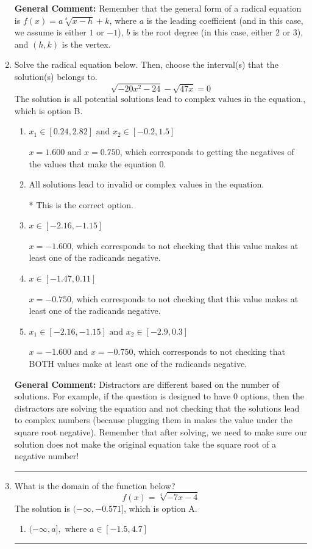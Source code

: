 \documentclass{extbook}[14pt]
\newcommand{\litem}[1]{\item #1

\rule{\textwidth}{0.4pt}}
\begin{document}
\begin{enumerate}
{\textbf{General Comment:} Remember that the general form of a radical equation is $ f(x) = a \sqrt[b]{x - h} + k$, where $a$ is the leading coefficient (and in this case, we assume is either $1$ or $-1$), $b$ is the root degree (in this case, either $2$ or $3$), and $(h, k)$ is the vertex.
}
\litem{
Solve the radical equation below. Then, choose the interval(s) that the solution(s) belongs to.
\[ \sqrt{-20 x^2 - 24} - \sqrt{47 x} = 0 \]The solution is \( \text{all potential solutions lead to complex values in the equation.} \), which is option B.\begin{enumerate}[label=\Alph*.]
\item \( x_1 \in [0.24, 2.82] \text{ and } x_2 \in [-0.2,1.5] \)

$x = 1.600 \text{ and } x = 0.750$, which corresponds to getting the negatives of the values that make the equation 0.
\item \( \text{All solutions lead to invalid or complex values in the equation.} \)

* This is the correct option.
\item \( x \in [-2.16,-1.15] \)

$x = -1.600$, which corresponds to not checking that this value makes at least one of the radicands negative.
\item \( x \in [-1.47,0.11] \)

$x = -0.750$, which corresponds to not checking that this value makes at least one of the radicands negative.
\item \( x_1 \in [-2.16, -1.15] \text{ and } x_2 \in [-2.9,0.3] \)

$x = -1.600 \text{ and } x = -0.750$, which corresponds to not checking that BOTH values make at least one of the radicands negative.
\end{enumerate}

\textbf{General Comment:} Distractors are different based on the number of solutions. For example, if the question is designed to have 0 options, then the distractors are solving the equation and not checking that the solutions lead to complex numbers (because plugging them in makes the value under the square root negative). Remember that after solving, we need to make sure our solution does not make the original equation take the square root of a negative number!
}
\litem{
What is the domain of the function below?
\[ f(x) = \sqrt[4]{-7 x - 4} \]The solution is \( (-\infty, -0.571] \), which is option A.\begin{enumerate}[label=\Alph*.]
\item \( (-\infty, a], \text{ where } a \in [-1.5, 4.7] \)


\end{enumerate}}
\end{enumerate}
\end{document}
